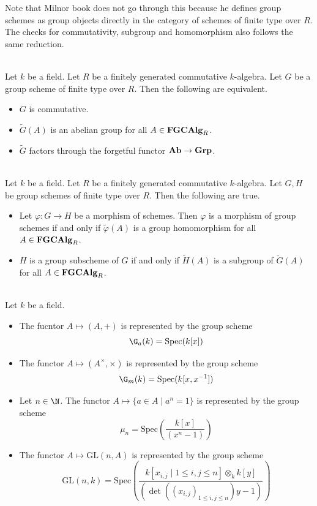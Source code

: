 \documentclass[a4paper]{article}
\begin{document}
Note that Milnor book does not go through this because he defines group schemes as group objects directly in the category of schemes of finite type over $R$. \\

The checks for commutativity, subgroup and homomorphism also follows the same reduction. 

\begin{lmm}{}{}\\
Let $k$ be a field. Let $R$ be a finitely generated commutative $k$-algebra. Let $G$ be a group scheme of finite type over $R$. Then the following are equivalent. 
\begin{itemize}
\item $G$ is commutative. 
\item $\widetilde{G}(A)$ is an abelian group for all $A\in\bold{FGCAlg}_R$. 
\item $\widetilde{G}$ factors through the forgetful functor $\bold{Ab}\to\bold{Grp}$. 
\end{itemize}
\end{lmm}

\begin{lmm}{}{}\\
Let $k$ be a field. Let $R$ be a finitely generated commutative $k$-algebra. Let $G,H$ be group schemes of finite type over $R$. Then the following are true. 
\begin{itemize}
\item Let $\varphi:G\to H$ be a morphism of schemes. Then $\varphi$ is a morphism of group schemes if and only if $\widetilde{\varphi}(A)$ is a group homomorphism for all $A\in\bold{FGCAlg}_R$. 
\item $H$ is a group subscheme of $G$ if and only if $\widetilde{H}(A)$ is a subgroup of $\widetilde{G}(A)$ for all $A\in\bold{FGCAlg}_R$. 
\end{itemize}
\end{lmm}

\begin{eg}{}{}\\
Let $k$ be a field. 
\begin{itemize}
\item The fucntor $A\mapsto(A,+)$ is represented by the group scheme $$\G_a(k)=\text{Spec}(k[x])$$
\item The functor $A\mapsto(A^\times,\times)$ is represented by the group scheme $$\G_m(k)=\text{Spec}(k[x,x^{-1}])$$
\item Let $n\in\N$. The functor $A\mapsto\{a\in A\;|\;a^n=1\}$ is represented by the group scheme $$\mu_n=\text{Spec}\left(\frac{k[x]}{(x^n-1)}\right)$$
\item The functor $A\mapsto\text{GL}(n,A)$ is represented by the group scheme $$\text{GL}(n,k)=\text{Spec}\left(\frac{k[x_{i,j}\;|\;1\leq i,j\leq n]\otimes_kk[y]}{(\det((x_{i,j})_{1\leq i,j\leq n})y-1)}\right)$$
\end{itemize}
\end{eg}
\end{document}
